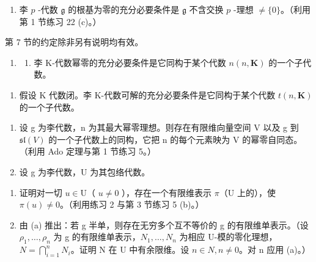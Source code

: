 \begin{enumerate}
\def\labelenumi{(\alph{enumi})}
\setcounter{enumi}{1}
\tightlist
\item
  李 \(p\) -代数 \(\mathfrak{g}\) 的根基为零的充分必要条件是 \(\mathfrak{g}\) 不含交换 \(p\) -理想 \(\neq \{0\}\)。（利用第 1 节练习 22 (c)。）
\end{enumerate}


第 7 节的约定除非另有说明均有效。

\begin{enumerate}
\def\labelenumi{\arabic{enumi}.}
\tightlist
\item
  \begin{enumerate}
  \def\labelenumii{(\alph{enumii})}
  \tightlist
  \item
    李 K-代数幂零的充分必要条件是它同构于某个代数 \(n(n, \mathbf{K})\) 的一个子代数。
  \end{enumerate}
\end{enumerate}

\begin{enumerate}
\def\labelenumi{(\alph{enumi})}
\setcounter{enumi}{1}
\tightlist
\item
  假设 K 代数闭。李 K-代数可解的充分必要条件是它同构于某个代数 \(t(n, \mathbf{K})\) 的一个子代数。
\end{enumerate}

\begin{enumerate}
\def\labelenumi{\arabic{enumi}.}
\setcounter{enumi}{1}
\item
  设 g 为李代数，n 为其最大幂零理想。则存在有限维向量空间 V 以及 g 到 \(\mathfrak{sl}(V)\) 的一个子代数上的同构，它把 n 的每个元素映为 V 的幂零自同态。（利用 Ado 定理与第 1 节练习 5。）
\item
  设 g 为李代数，U 为其包络代数。
\end{enumerate}

\begin{enumerate}
\def\labelenumi{(\alph{enumi})}
\item
  证明对一切 \(u \in \mathrm{U}\)（ \(u \neq 0\) ），存在一个有限维表示 \(\pi\)（\(\mathrm{U}\) 上的），使 \(\pi(u) \neq 0\)。（利用练习 2 与第 3 节练习 5 (b)。）
\item
  由 (a) 推出：若 g 半单，则存在无穷多个互不等价的 g 的有限维单表示。（设 \(\rho_{1},\ldots,\rho_{n}\) 为 g 的有限维单表示，\(N_{1},\ldots,N_{n}\) 为相应 U-模的零化理想，\(N=\bigcap_{i=1}^{n}N_{i}\)。证明 N 在 U 中有余限维。设 \(n\in N,n\neq0\)。对 n 应用 (a)。）
\end{enumerate}

